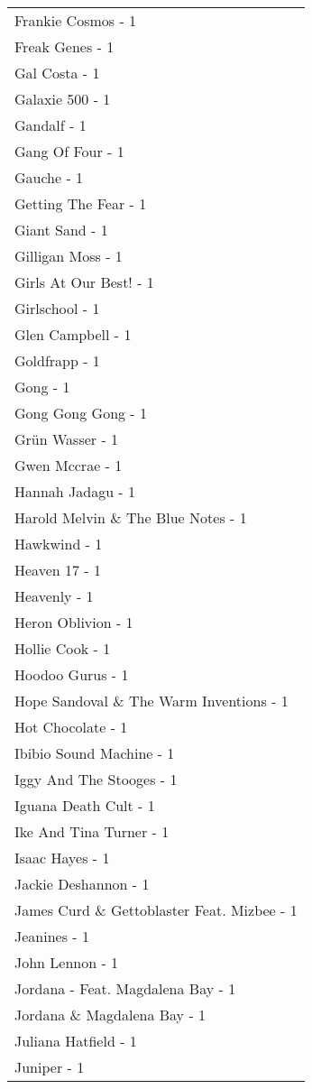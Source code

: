 \documentclass[
]{article}
\begin{document}
\begin{longtable}{l}
Frankie Cosmos - 1 \\ 
Freak Genes - 1 \\ 
Gal Costa - 1 \\ 
Galaxie 500 - 1 \\ 
Gandalf - 1 \\ 
Gang Of Four - 1 \\ 
Gauche - 1 \\ 
Getting The Fear - 1 \\ 
Giant Sand - 1 \\ 
Gilligan Moss - 1 \\ 
Girls At Our Best! - 1 \\ 
Girlschool - 1 \\ 
Glen Campbell - 1 \\ 
Goldfrapp - 1 \\ 
Gong - 1 \\ 
Gong Gong Gong - 1 \\ 
Grün Wasser - 1 \\ 
Gwen Mccrae - 1 \\ 
Hannah Jadagu - 1 \\ 
Harold Melvin \& The Blue Notes - 1 \\ 
Hawkwind - 1 \\ 
Heaven 17 - 1 \\ 
Heavenly - 1 \\ 
Heron Oblivion - 1 \\ 
Hollie Cook - 1 \\ 
Hoodoo Gurus - 1 \\ 
Hope Sandoval \& The Warm Inventions - 1 \\ 
Hot Chocolate - 1 \\ 
Ibibio Sound Machine - 1 \\ 
Iggy And The Stooges - 1 \\ 
Iguana Death Cult - 1 \\ 
Ike And Tina Turner - 1 \\ 
Isaac Hayes - 1 \\ 
Jackie Deshannon - 1 \\ 
James Curd \& Gettoblaster Feat. Mizbee - 1 \\ 
Jeanines - 1 \\ 
John Lennon - 1 \\ 
Jordana - Feat. Magdalena Bay - 1 \\ 
Jordana \& Magdalena Bay - 1 \\ 
Juliana Hatfield - 1 \\ 
Juniper - 1 \\ 

\end{longtable}
\end{document}
